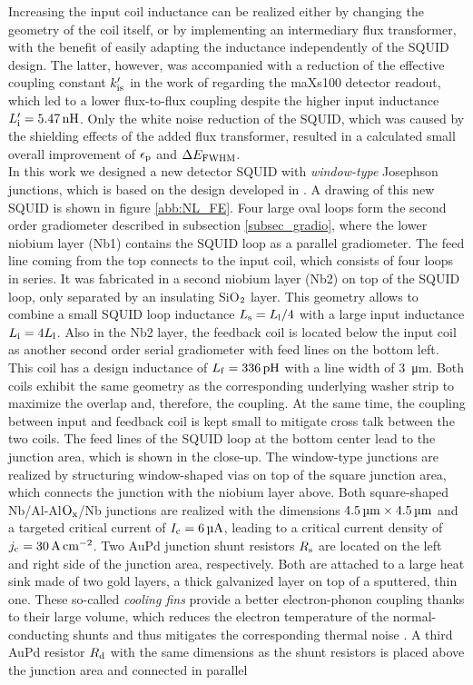 Increasing the input coil inductance can be realized either by changing the geometry of the coil itself, or by implementing an intermediary flux transformer, with the benefit of easily adapting the inductance independently of the SQUID design. The latter, however, was accompanied with a reduction of the effective coupling constant $k_{\rm is}'$ in the work of \cite{Bauer2022} regarding the maXs100 detector readout, which led to a lower flux-to-flux coupling despite the higher input inductance $L_{\rm i}'=\qty{5.47}{\nano\henry}$. Only the white noise reduction of the SQUID, which was caused by the shielding effects of the added flux transformer, resulted in a calculated small overall improvement of $\epsilon_{\rm p}$ and $\Delta E_{\rm FWHM}$. \\
In this work we designed a new detector SQUID with \textit{window-type} Josephson junctions, which is based on the design developed in \cite{Bauer2022}. A drawing of this new SQUID is shown in figure \ref{abb:NL_FE}. Four large oval loops form the second order gradiometer described in subsection \ref{subsec_gradio}, where the lower niobium layer (Nb1) contains the SQUID loop as a parallel gradiometer. The feed line coming from the top connects to the input coil, which consists of four loops in series. It was fabricated in a second niobium layer (Nb2) on top of the SQUID loop, only separated by an insulating SiO$_{\rm 2}$ layer. This geometry allows to combine a small SQUID loop inductance $L_{\rm s}=L_{\rm l}/4$ with a large input inductance $L_{\rm i}=4L_{\rm l}$. Also in the Nb2 layer, the feedback coil is located below the input coil as another second order serial gradiometer with feed lines on the bottom left. This coil has a design inductance of $L_{\rm f}=\qty{336}{\pico\henry}$ with a line width of \qty{3}{\micro\meter}. Both coils exhibit the same geometry as the corresponding underlying washer strip to maximize the overlap and, therefore, the coupling. At the same time, the coupling between input and feedback coil is kept small to mitigate cross talk between the two coils. The feed lines of the SQUID loop at the bottom center lead to the junction area, which is shown in the close-up. The window-type junctions are realized by structuring window-shaped vias on top of the square junction area, which connects the junction with the niobium layer above. Both square-shaped Nb/Al-Al$\rm O_x$/Nb junctions are realized with the dimensions $\qtyproduct{4.5 x 4.5}{\micro\meter}$ and a targeted critical current of $I_{\rm c}=\qty{6}{\micro\ampere}$, leading to a critical current density of $j_{\rm c}=\qty{30}{\ampere\per\centi\meter\squared}$. Two AuPd junction shunt resistors $R_{\rm s}$ are located on the left and right side of the junction area, respectively. Both are attached to a large heat sink made of two gold layers, a thick galvanized layer on top of a sputtered, thin one. These so-called \textit{cooling fins} provide a better electron-phonon coupling thanks to their large volume, which reduces the electron temperature of the normal-conducting shunts and thus mitigates the corresponding thermal noise \cite{Mazibrada2024}. A third AuPd resistor $R_{\rm d}$ with the same dimensions as the shunt resistors is placed above the junction area and connected in parallel 